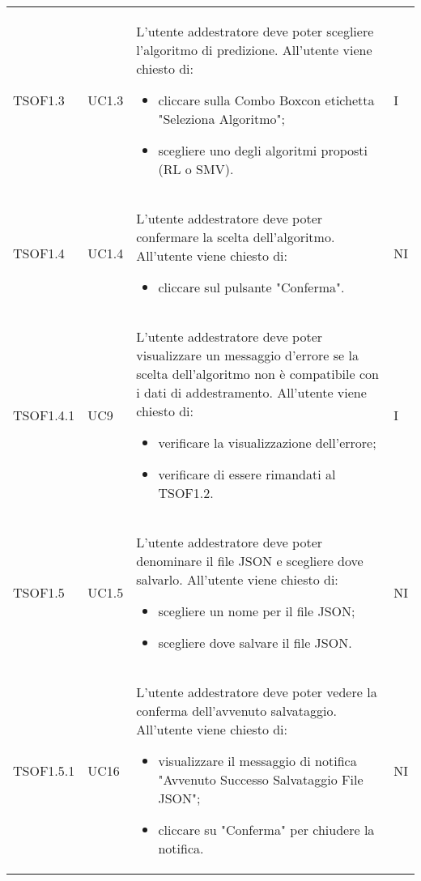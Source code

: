 \begin{longtable}{C{2.5cm} C{2.5cm} L{8cm} C{2cm}}
TSOF1.3 & UC1.3 & 
L'utente addestratore deve poter scegliere l'algoritmo di predizione. \newline All'utente viene chiesto di:
\begin{itemize}
	\item cliccare sulla Combo Box\glo con etichetta "Seleziona Algoritmo";
	\item scegliere uno degli algoritmi proposti (RL o SMV).
\end{itemize} & I \\
 
TSOF1.4 & UC1.4 & 
L'utente addestratore deve poter confermare la scelta dell'algoritmo. \newline All'utente viene chiesto di:
\begin{itemize}
	\item cliccare sul pulsante "Conferma".
\end{itemize} & NI \\

TSOF1.4.1 & UC9 & 
L'utente addestratore deve poter visualizzare un messaggio d'errore se la scelta dell'algoritmo non è compatibile con i dati di addestramento. \newline All'utente viene chiesto di:
\begin{itemize}
	\item verificare la visualizzazione dell'errore;
	\item verificare di essere rimandati al TSOF1.2.
\end{itemize} & I \\

TSOF1.5 & UC1.5 & 
L'utente addestratore deve poter denominare il file JSON e scegliere dove salvarlo. \newline All'utente viene chiesto di:
\begin{itemize}
	\item scegliere un nome per il file JSON;
	\item scegliere dove salvare il file JSON.
\end{itemize} & NI \\

TSOF1.5.1 & UC16 &
L'utente addestratore deve poter vedere la conferma dell'avvenuto salvataggio. \newline All'utente viene chiesto di:
\begin{itemize}
	\item visualizzare il messaggio di notifica "Avvenuto Successo Salvataggio File JSON";
	\item cliccare su "Conferma" per chiudere la notifica.
\end{itemize} & NI	\\


\end{longtable}

